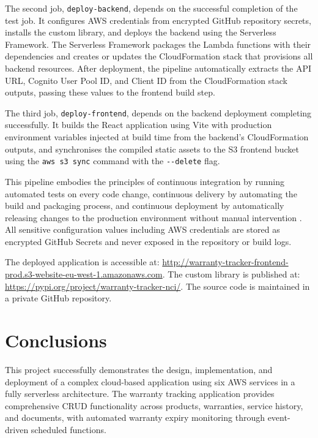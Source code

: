 \documentclass[conference]{IEEEtran}
\begin{document}
The second job, \texttt{deploy-backend}, depends on the successful completion of the test job. It configures AWS credentials from encrypted GitHub repository secrets, installs the custom library, and deploys the backend using the Serverless Framework. The Serverless Framework packages the Lambda functions with their dependencies and creates or updates the CloudFormation stack that provisions all backend resources. After deployment, the pipeline automatically extracts the API URL, Cognito User Pool ID, and Client ID from the CloudFormation stack outputs, passing these values to the frontend build step.

The third job, \texttt{deploy-frontend}, depends on the backend deployment completing successfully. It builds the React application using Vite with production environment variables injected at build time from the backend's CloudFormation outputs, and synchronises the compiled static assets to the S3 frontend bucket using the \texttt{aws s3 sync} command with the \texttt{-{}-delete} flag.

This pipeline embodies the principles of continuous integration by running automated tests on every code change, continuous delivery by automating the build and packaging process, and continuous deployment by automatically releasing changes to the production environment without manual intervention \cite{awswell2023}. All sensitive configuration values including AWS credentials are stored as encrypted GitHub Secrets and never exposed in the repository or build logs.

The deployed application is accessible at: \url{http://warranty-tracker-frontend-prod.s3-website-eu-west-1.amazonaws.com}. The custom library is published at: \url{https://pypi.org/project/warranty-tracker-nci/}. The source code is maintained in a private GitHub repository.

\section{Conclusions}

This project successfully demonstrates the design, implementation, and deployment of a complex cloud-based application using six AWS services in a fully serverless architecture. The warranty tracking application provides comprehensive CRUD functionality across products, warranties, service history, and documents, with automated warranty expiry monitoring through event-driven scheduled functions.
\end{document}
